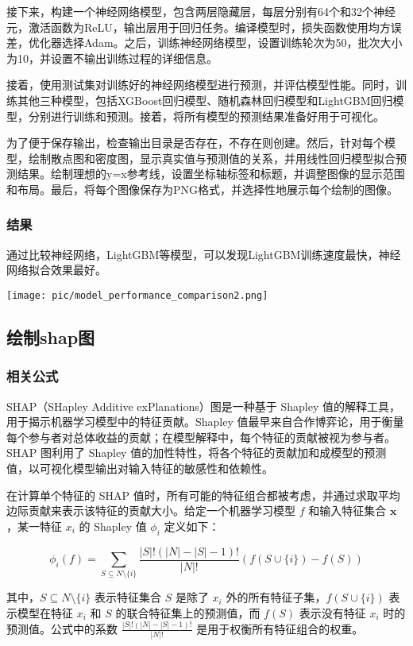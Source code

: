 \documentclass{article}
\begin{document}
接下来，构建一个神经网络模型，包含两层隐藏层，每层分别有64个和32个神经元，激活函数为ReLU，输出层用于回归任务。编译模型时，损失函数使用均方误差，优化器选择Adam。之后，训练神经网络模型，设置训练轮次为50，批次大小为10，并设置不输出训练过程的详细信息。

接着，使用测试集对训练好的神经网络模型进行预测，并评估模型性能。同时，训练其他三种模型，包括XGBoost回归模型、随机森林回归模型和LightGBM回归模型，分别进行训练和预测。接着，将所有模型的预测结果准备好用于可视化。

为了便于保存输出，检查输出目录是否存在，不存在则创建。然后，针对每个模型，绘制散点图和密度图，显示真实值与预测值的关系，并用线性回归模型拟合预测结果。绘制理想的y=x参考线，设置坐标轴标签和标题，并调整图像的显示范围和布局。最后，将每个图像保存为PNG格式，并选择性地展示每个绘制的图像。
\subsubsection{结果}
通过比较神经网络，LightGBM等模型，可以发现LightGBM训练速度最快，神经网络拟合效果最好。
\par
\texttt{[image: pic/model\_performance\_comparison2.png]} %

\subsection{绘制shap图}
\subsubsection{相关公式}
SHAP（SHapley Additive exPlanations）图是一种基于 Shapley 值的解释工具，用于揭示机器学习模型中的特征贡献。Shapley 值最早来自合作博弈论，用于衡量每个参与者对总体收益的贡献；在模型解释中，每个特征的贡献被视为参与者。SHAP 图利用了 Shapley 值的加性特性，将各个特征的贡献加和成模型的预测值，以可视化模型输出对输入特征的敏感性和依赖性。

在计算单个特征的 SHAP 值时，所有可能的特征组合都被考虑，并通过求取平均边际贡献来表示该特征的贡献大小。给定一个机器学习模型 \( f \) 和输入特征集合 \( \mathbf{x} \)，某一特征 \( x_i \) 的 Shapley 值 \( \phi_i \) 定义如下：

\[
\phi_i(f) = \sum_{S \subseteq N \setminus \{i\}} \frac{|S|! (|N| - |S| - 1)!}{|N|!} \left( f(S \cup \{i\}) - f(S) \right)
\]

其中，\( S \subseteq N \setminus \{i\} \) 表示特征集合 \( S \) 是除了 \( x_i \) 外的所有特征子集，\( f(S \cup \{i\}) \) 表示模型在特征 \( x_i \) 和 \( S \) 的联合特征集上的预测值，而 \( f(S) \) 表示没有特征 \( x_i \) 时的预测值。公式中的系数 \( \frac{|S|! (|N| - |S| - 1)!}{|N|!} \) 是用于权衡所有特征组合的权重。
\end{document}
